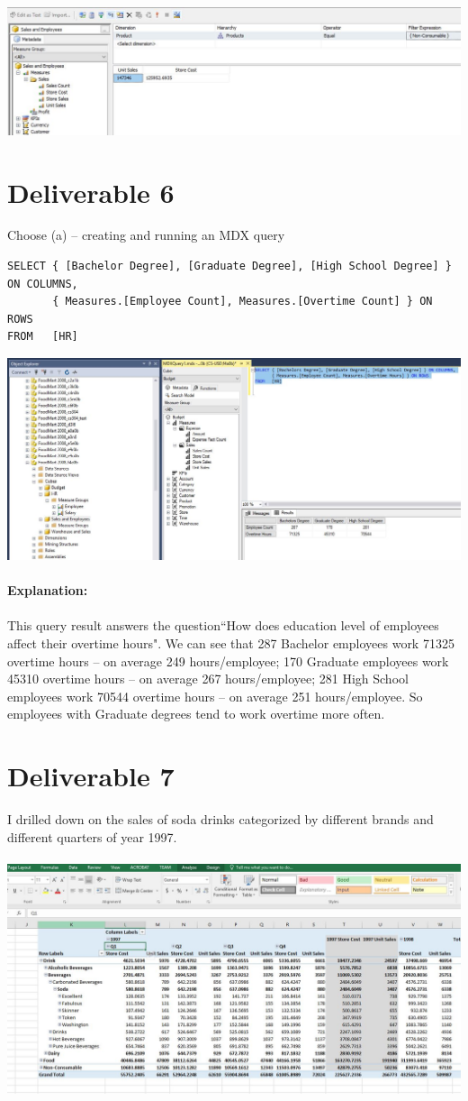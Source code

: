 \documentclass{article}
\begin{document}
\noindent \includegraphics[scale=0.7]{deliverable5_3.jpg}

\section{Deliverable 6}

Choose (a) -- creating and running an MDX query

\begin{verbatim}
SELECT { [Bachelor Degree], [Graduate Degree], [High School Degree] } ON COLUMNS,
       { Measures.[Employee Count], Measures.[Overtime Count] } ON ROWS
FROM   [HR]
\end{verbatim}

\noindent \includegraphics[scale=0.6]{deliverable6.jpg}\\
\\
\noindent \textbf{Explanation:}\\
\\
This query result answers the question``How does education level of employees affect their overtime hours". We can see that 287 Bachelor employees work 71325 overtime hours -- on average 249 hours/employee; 170 Graduate employees work 45310 overtime hours -- on average 267 hours/employee; 281 High School employees work 70544 overtime hours -- on average 251 hours/employee. So employees with Graduate degrees tend to work overtime more often.

\section{Deliverable 7}

I drilled down on the sales of soda drinks categorized by different brands and different quarters of year 1997.\\
\\
\noindent \includegraphics[scale=0.61]{deliverable7.jpg}
\end{document}
